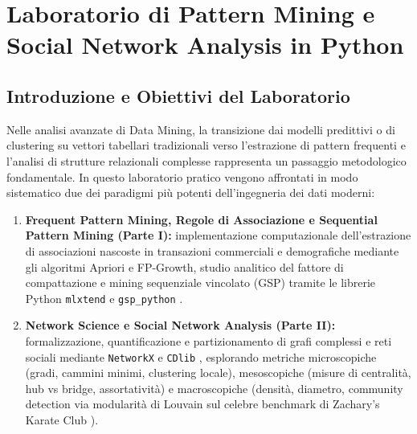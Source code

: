 \chapter{Laboratorio di Pattern Mining e Social Network Analysis in Python}
\label{chap:lab-pattern-mining-social-network}

\FloatBarrier
\section{Introduzione e Obiettivi del Laboratorio}
\label{sec:lab-pm-sna-intro}

Nelle analisi avanzate di Data Mining, la transizione dai modelli predittivi o di clustering su vettori tabellari tradizionali verso l'estrazione di pattern frequenti e l'analisi di strutture relazionali complesse rappresenta un passaggio metodologico fondamentale. In questo laboratorio pratico vengono affrontati in modo sistematico due dei paradigmi più potenti dell'ingegneria dei dati moderni:
\begin{enumerate}
    \item \textbf{Frequent Pattern Mining, Regole di Associazione e Sequential Pattern Mining (Parte I):} implementazione computazionale dell'estrazione di associazioni nascoste in transazioni commerciali e demografiche mediante gli algoritmi Apriori e FP-Growth, studio analitico del fattore di compattazione e mining sequenziale vincolato (GSP) tramite le librerie Python \texttt{mlxtend} \cite{agrawal1994,han2000} e \texttt{gsp\_python} \cite{agrawal1995}.
    \item \textbf{Network Science e Social Network Analysis (Parte II):} formalizzazione, quantificazione e partizionamento di grafi complessi e reti sociali mediante \texttt{NetworkX} \cite{barabasi2016} e \texttt{CDlib} \cite{rossetti2019}, esplorando metriche microscopiche (gradi, cammini minimi, clustering locale), mesoscopiche (misure di centralità, hub vs bridge, assortatività) e macroscopiche (densità, diametro, community detection via modularità di Louvain \cite{blondel2008} sul celebre benchmark di Zachary's Karate Club \cite{zachary1977}).
\end{enumerate}

